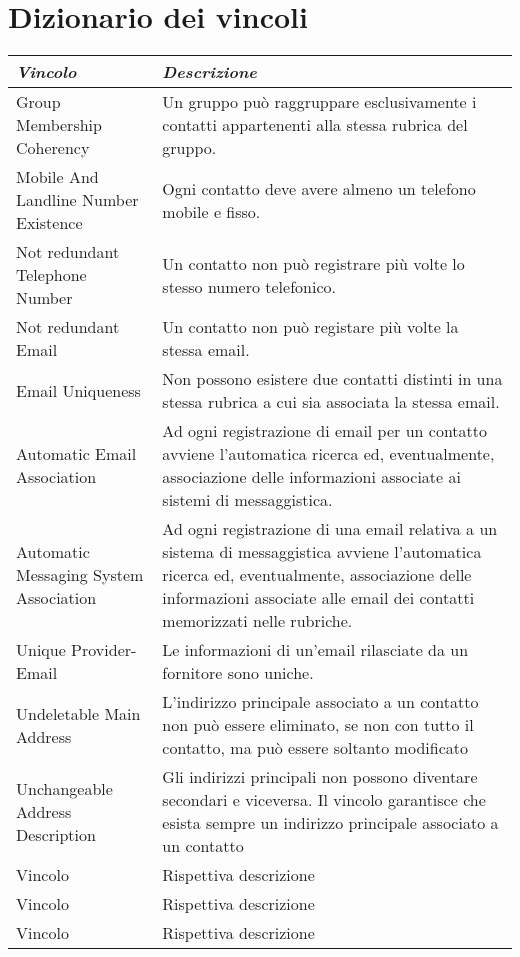 \section{Dizionario dei vincoli}
\begin{longtable}{p{}p{}}
\toprule
\textit{Vincolo} & \textit{Descrizione}
\\ \midrule
Group Membership Coherency &
Un gruppo può raggruppare esclusivamente i contatti appartenenti alla stessa rubrica del gruppo.
\\ \midrule
Mobile And Landline Number Existence & 
Ogni contatto deve avere almeno un telefono mobile e fisso. 
\\ \midrule
Not redundant Telephone Number & 
Un contatto non può registrare più volte lo stesso numero telefonico.
\\ \midrule
Not redundant Email & 
Un contatto non può registare più volte la stessa email. 
\\ \midrule
Email Uniqueness & 
Non possono esistere due contatti distinti in una stessa rubrica a cui sia associata la stessa email. 
\\ \midrule
Automatic Email Association & 
Ad ogni registrazione di email per un contatto avviene l'automatica ricerca ed, eventualmente, associazione delle informazioni associate ai sistemi di messaggistica. 
\\ \midrule
Automatic Messaging System Association & 
Ad ogni registrazione di una email relativa a un sistema di messaggistica avviene l'automatica ricerca ed, eventualmente, associazione delle informazioni associate alle email dei contatti memorizzati nelle rubriche. 
\\ \midrule
Unique Provider-Email & 
Le informazioni di un'email rilasciate da un fornitore sono uniche. 
\\ \midrule
Undeletable Main Address & 
L'indirizzo principale associato a un contatto non può essere eliminato, se non con tutto il contatto, ma può essere soltanto modificato
\\ \midrule
Unchangeable Address Description  & 
Gli indirizzi principali non possono diventare secondari e viceversa. Il vincolo garantisce che esista sempre un indirizzo principale associato a un contatto
\\ \midrule
Vincolo & 
Rispettiva descrizione
\\ \midrule
Vincolo & 
Rispettiva descrizione
\\ \midrule
Vincolo & 
Rispettiva descrizione
\\ \bottomrule
\endhead
\end{longtable}